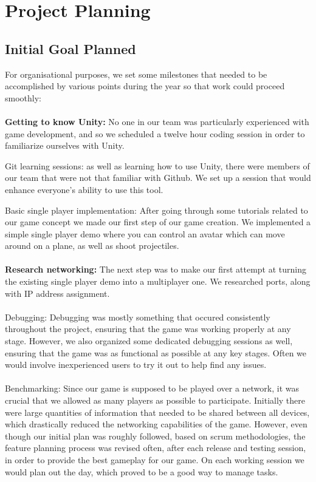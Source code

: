 \documentclass[11pt,a4paper]{article}
\begin{document}
\pagebreak



        \section{Project Planning}

        \subsection{Initial Goal Planned}

        For organisational purposes, we set some milestones that needed to be accomplished by various points during the year so that work could proceed smoothly: \\ \\

        \textbf{Getting to know Unity:} No one in our team was particularly experienced with game development, and so we scheduled a twelve hour coding session in order to familiarize ourselves with Unity.

        Git learning sessions: as well as learning how to use Unity, there were members of our team that were not that familiar with Github. We set up a session that would enhance everyone’s ability to use this tool.
        
        Basic single player implementation: After going through some tutorials related to our game concept we made our first step of our game creation. We implemented a simple single player demo where you can control an avatar which can move around on a plane, as well as shoot projectiles. \\ \\

        \textbf{Research networking:} The next step was to make our first attempt at turning the existing single player demo into a multiplayer one. We researched ports, along with IP address assignment. \\ \\
        Debugging: Debugging was mostly something that occured consistently throughout the project, ensuring that the game was working properly at any stage. However, we also organized some dedicated debugging sessions as well, ensuring that the game was as functional as possible at any key stages. Often we would involve inexperienced users to try it out to help find any issues. \\ \\
        Benchmarking: Since our game is supposed to be played over a network, it was crucial that we allowed as many players as possible to participate. Initially there were large quantities of information that needed to be shared between all devices, which drastically reduced the networking capabilities of the game.
        However, even though our initial plan was roughly followed, based on scrum methodologies, the feature planning process was revised often, after each release and testing session, in order to provide the best gameplay for our game. On each working session we would plan out the day, which proved to be a good way to manage tasks.
\end{document}
